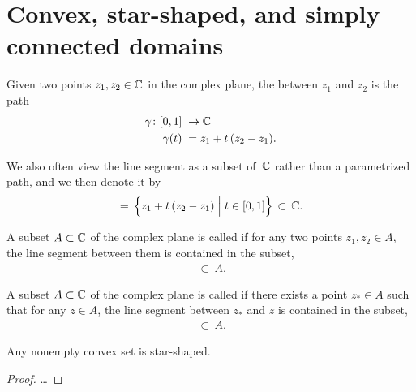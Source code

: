 \section{Convex, star-shaped, and simply connected domains}

\begin{definition}
  \label{def:line_segment}
  Given two points $z_1, z_2 \in \mathbb{C}$ in the complex plane,
  the  between $z_1$ and $z_2$ is the path
  \begin{align*}
    \gamma \colon [0,1] & \; \to \mathbb{C} \\
    \gamma(t) & \; = z_1 + t \, (z_2 - z_1) .
  \end{align*}

  We also often view the line segment as a subset of~$\mathbb{C}$
  rather than a parametrized path, and we then denote it by
  \begin{align*}
    [z_1, z_2]
    \, = \, \Big\{ z_1 + t \, (z_2 - z_1) \; \Big| \; t \in [0,1] \Big\}
    \, \subset \, \bC.
  \end{align*}
\end{definition}

\begin{definition}
  \label{def:convex}
  A subset $A \subset \mathbb{C}$ of the complex plane is called
   if for any two points $z_1, z_2 \in A$,
  the line segment between them is contained in the subset,
  \begin{align*}
    [z_1, z_2] \, \subset \, A .
  \end{align*}
\end{definition}

\begin{definition}
  \label{def:star_shaped}
  A subset $A \subset \mathbb{C}$ of the complex plane is called
   if there exists a point $z_* \in A$
  such that for any $z \in A$,
  the line segment between $z_*$ and $z$ is contained in the subset,
  \begin{align*}
    [z_*, z] \, \subset \, A .
  \end{align*}
\end{definition}

\begin{lemma}
  \label{lem:convex_implies_star_shaped}
  Any nonempty convex set is star-shaped.
\end{lemma}
\begin{proof}
  \ldots
\end{proof}

